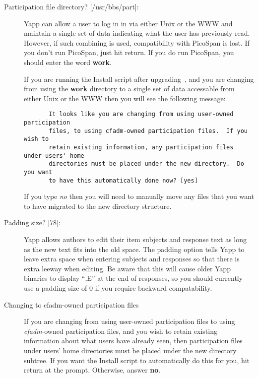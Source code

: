 \documentclass[twoside]{report}
\begin{document}
\begin{enumerate}
\begin{description}
      \item[{Participation file directory? [/usr/bbs/part]:}]
         \mbox{}\newline
         Yapp can allow a user to log in in via either Unix or the WWW and
         maintain a single set of data indicating what the user has 
         previously read.  However, if such combining is used, compatibility 
         with PicoSpan is lost.  If you don't run PicoSpan, just hit return.  
         If you do run PicoSpan, you should enter the word {\bf work}.

         If you are running the Install script after upgrading~, 
         and you are changing from using the {\bf work} directory to a 
         single set of data accessable from either Unix or the WWW then 
         you will see the following message:

   \begin{verbatim}
       It looks like you are changing from using user-owned participation
       files, to using cfadm-owned participation files.  If you wish to 
       retain existing information, any participation files under users' home 
       directories must be placed under the new directory.  Do you want
       to have this automatically done now? [yes]
   \end{verbatim}

         If you type {\em no} then you will need to manually move any files that
         you want to have migrated to the new directory structure.

      \item[{Padding size? [78]:}]
         \mbox{}\newline
         Yapp allows authors to edit their item subjects and response text
         as long as the new text fits into the old space.  The padding option
         tells Yapp to leave extra space when entering subjects and responses
         so that there is extra leeway when editing.  Be aware that this will
         cause older Yapp binaries to display ``,E'' at the end of responses, 
         so you should currently use a padding size of 0 if you require 
         backward compatability.

      \item[Changing to cfadm-owned participation files]
         \mbox{}\newline
         If you are changing from using user-owned participation
         files to using {\em cfadm}-owned participation files, and you wish 
         to retain existing information about what users have already seen, 
         then participation files under users' home directories must be 
         placed under the new directory subtree.  If you want the Install
         script to automatically do this for you, hit return at the prompt.
         Otherwise, answer {\bf no}.
      \end{description}


\end{enumerate}
\end{document}
